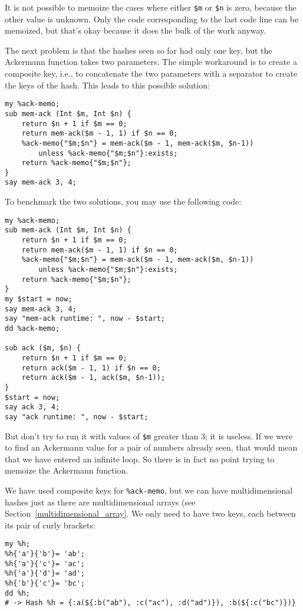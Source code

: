 It is not possible to memoize the cases where either \verb'$m' 
or \verb'$n' is zero, because the other value is unknown. Only 
the code corresponding to the last code line can be memoized, 
but that's okay because it does the bulk of the work anyway.

The next problem is that the hashes seen so far had only one 
key, but the Ackermann function takes two parameters. The 
simple workaround is to create a composite key, i.e., to 
concatenate the two parameters with a separator to create 
the keys of the hash. This leads to this possible solution:

\begin{verbatim}
my %ack-memo;
sub mem-ack (Int $m, Int $n) {
    return $n + 1 if $m == 0;
    return mem-ack($m - 1, 1) if $n == 0;
    %ack-memo{"$m;$n"} = mem-ack($m - 1, mem-ack($m, $n-1))
        unless %ack-memo{"$m;$n"}:exists;
    return %ack-memo{"$m;$n"};
}
say mem-ack 3, 4;
\end{verbatim} 

To benchmark the two solutions, you may use the following 
code:

\begin{verbatim}
my %ack-memo;
sub mem-ack (Int $m, Int $n) {
    return $n + 1 if $m == 0;
    return mem-ack($m - 1, 1) if $n == 0;
    %ack-memo{"$m;$n"} = mem-ack($m - 1, mem-ack($m, $n-1)) 
        unless %ack-memo{"$m;$n"}:exists;
    return %ack-memo{"$m;$n"};
}
my $start = now;
say mem-ack 3, 4;
say "mem-ack runtime: ", now - $start;
dd %ack-memo;

sub ack ($m, $n) {
    return $n + 1 if $m == 0;
    return ack($m - 1, 1) if $n == 0;
    return ack($m - 1, ack($m, $n-1));
}
$start = now;
say ack 3, 4;
say "ack runtime: ", now - $start;
\end{verbatim}

But don't try to run it with values of \verb'$m' greater 
than 3; it is useless. If we were to find an Ackermann 
value for a pair of numbers already seen, that would 
mean that we have entered an infinite loop. So there is 
in fact no point trying to memoize the Ackermann function.

We have used composite keys for \verb'%ack-memo', but we 
can have multidimensional hashes just as there are 
multidimensional arrays (see Section~\ref{multidimensional_array}. 
We only need to have two keys, each between its pair of 
curly brackets:
\begin{verbatim}
my %h;
%h{'a'}{'b'}= 'ab';
%h{'a'}{'c'}= 'ac';
%h{'a'}{'d'}= 'ad';
%h{'b'}{'c'}= 'bc';
dd %h; 
# -> Hash %h = {:a(${:b("ab"), :c("ac"), :d("ad")}), :b(${:c("bc")})}
\end{verbatim}
%

